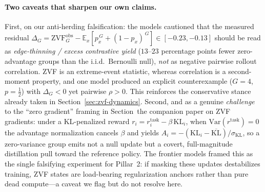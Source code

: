 \paragraph{Two caveats that sharpen our own claims.}
First, on our anti-herding falsification: the models cautioned that the
measured residual
$\Delta_G=\mathrm{ZVF}^{\mathrm{obs}}_G-\mathbb{E}_x[p_x^{\,G}+(1-p_x)^{\,G}]\in[-0.23,-0.13]$
should be read as \emph{edge-thinning / excess contrastive yield}
($13$--$23$ percentage points fewer zero-advantage groups than the
i.i.d.\ Bernoulli null), \emph{not} as negative pairwise rollout
correlation. ZVF is an extreme-event statistic, whereas correlation is a
second-moment property, and one model produced an explicit counterexample
($G=4$, $p=\tfrac12$) with $\Delta_G<0$ yet pairwise $\rho>0$. This
reinforces the conservative stance already taken in
Section~\ref{sec:zvf-dynamics}. Second, and as a genuine \emph{challenge}
to the ``zero gradient'' framing in Section~the companion paper on ZVF gradients: under
a KL-penalized reward $r_i=r^{\mathrm{task}}_i-\beta\,\mathrm{KL}_i$, when
$\mathrm{Var}(r^{\mathrm{task}})=0$ the advantage normalization cancels
$\beta$ and yields
$A_i=-(\mathrm{KL}_i-\overline{\mathrm{KL}})/\sigma_{\mathrm{KL}}$, so a
zero-variance group emits not a null update but a covert, full-magnitude
distillation pull toward the reference policy. The frontier models framed
this as the single falsifying experiment for Pillar~2: if masking these
updates destabilizes training, ZVF states are load-bearing regularization
anchors rather than pure dead compute---a caveat we flag but do not
resolve here.
